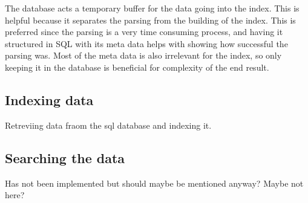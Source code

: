 The database acts a temporary buffer for the data going into the index. This is helpful because it separates the parsing from the building of the index. This is preferred since the parsing is a very time consuming process, and having it structured in SQL with its meta data helps with showing how successful the parsing was. Most of the meta data is also irrelevant for the index, so only keeping it in the database is beneficial for complexity of the end result.


\subsection{Indexing data}

Retreviing data fraom the sql database and indexing it.

\subsection{Searching the data}

Has not been implemented but should maybe be mentioned anyway? Maybe not here?


\cleardoublepage